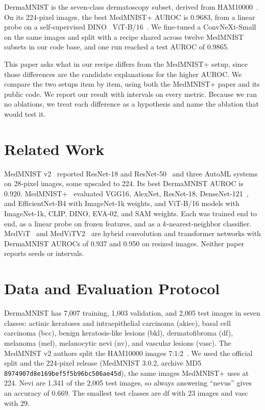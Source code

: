 \documentclass[conference]{IEEEtran}
\begin{document}
DermaMNIST is the seven-class dermatoscopy subset, derived from HAM10000~\cite{tschandl2018ham10000}. On its 224-pixel images, the best MedMNIST+ AUROC is 0.9683, from a linear probe on a self-supervised DINO~\cite{caron2021dino} ViT-B/16~\cite{dosovitskiy2021vit}. We fine-tuned a ConvNeXt-Small~\cite{liu2022convnext} on the same images and split with a recipe shared across twelve MedMNIST subsets in our code base, and one run reached a test AUROC of 0.9865.

This paper asks what in our recipe differs from the MedMNIST+ setup, since those differences are the candidate explanations for the higher AUROC. We compare the two setups item by item, using both the MedMNIST+ paper and its public code. We report our result with intervals on every metric. Because we ran no ablations, we treat each difference as a hypothesis and name the ablation that would test it.

\section{Related Work}

MedMNIST v2~\cite{yang2023medmnistv2} reported ResNet-18 and ResNet-50~\cite{he2016resnet} and three AutoML systems on 28-pixel images, some upscaled to 224. Its best DermaMNIST AUROC is 0.920. MedMNIST+~\cite{doerrich2025medmnistplus} evaluated VGG16, AlexNet, ResNet-18, DenseNet-121~\cite{huang2017densenet}, and EfficientNet-B4 with ImageNet-1k weights, and ViT-B/16 models with ImageNet-1k, CLIP, DINO, EVA-02, and SAM weights. Each was trained end to end, as a linear probe on frozen features, and as a $k$-nearest-neighbor classifier. MedViT~\cite{manzari2023medvit} and MedViTV2~\cite{manzari2026medvitv2} are hybrid convolution and transformer networks with DermaMNIST AUROCs of 0.937 and 0.950 on resized images. Neither paper reports seeds or intervals.

\section{Data and Evaluation Protocol}
\label{sec:protocol}

DermaMNIST has 7,007 training, 1,003 validation, and 2,005 test images in seven classes: actinic keratoses and intraepithelial carcinoma (akiec), basal cell carcinoma (bcc), benign keratosis-like lesions (bkl), dermatofibroma (df), melanoma (mel), melanocytic nevi (nv), and vascular lesions (vasc). The MedMNIST v2 authors split the HAM10000 images 7:1:2~\cite{yang2023medmnistv2}. We used the official split and the 224-pixel release (MedMNIST 3.0.2, archive MD5 \texttt{8974907d8e169bef5f5b96bc506ae45d}), the same images MedMNIST+ uses at 224. Nevi are 1,341 of the 2,005 test images, so always answering ``nevus'' gives an accuracy of 0.669. The smallest test classes are df with 23 images and vasc with 29.
\end{document}
